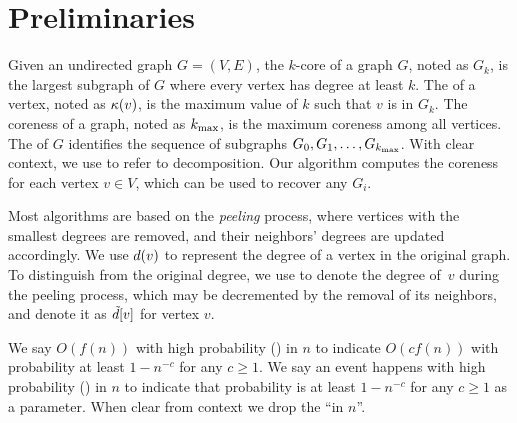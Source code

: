 \section{Preliminaries}\label{sec:prelim}

Given an undirected graph $G=(V,E)$, 
the $k$-core of a graph $G$, noted as $G_k$, is the largest subgraph of $G$ where every vertex has degree at least $k$.
The  of a vertex, noted as ${\kappa}(v)$, is the maximum value of $k$ such that $v$ is in $G_k$. 
The coreness of a graph, noted as $k_{\max}$, is the maximum coreness among all vertices. 
The  of $G$ identifies the sequence of subgraphs $G_0, G_1, \dots, G_{k_{\max}}$. 
With clear context, we use \kcore{} to refer to \kcore{} decomposition. 
Our algorithm computes the coreness for each vertex $v \in V$, 
which can be used to recover any $G_i$. 

Most \kcore{} algorithms are based on the \emph{peeling} process, 
where vertices with the smallest degrees are removed, and their neighbors' degrees are updated accordingly.
We use $d(v)$ to represent the degree of a vertex in the original graph. 
To distinguish from the original degree, 
we use  to denote the degree of~$v$ during the peeling process, 
which may be decremented by the removal of its neighbors, and denote it as $\tilde{d}[v]$ for vertex $v$. 

We say $O(f(n))$ {with high probability (\whp{}) in $n$} to indicate $O(cf(n))$ with probability at
least $1-n^{-c}$ for any $c \geq 1$.  
We say an event happens {with high probability (\whp{}) in $n$} to indicate that probability is at
least $1-n^{-c}$ for any $c \geq 1$ as a parameter.  
When clear from context we drop the ``in $n$''.


